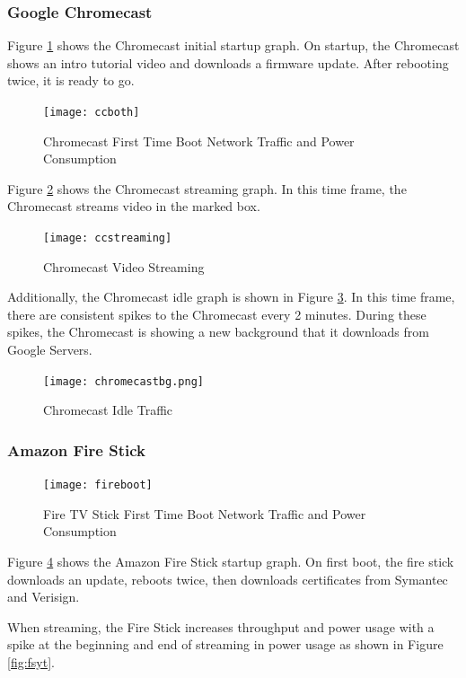\subsubsection{Google Chromecast}
Figure \ref{fig:ccboth} shows the Chromecast initial startup graph. On startup, the Chromecast shows an intro tutorial video and downloads a firmware update. After rebooting twice, it is ready to go.

\begin{figure}[H]
  \centering
  \texttt{[image: ccboth]}
  \caption{Chromecast First Time Boot Network Traffic and Power Consumption}
  \label{fig:ccboth}
\end{figure}

Figure \ref{fig:ccstream} shows the Chromecast streaming graph. In this time frame, the Chromecast streams video in the marked box.

\begin{figure}[H]
  \centering
  \texttt{[image: ccstreaming]}
  \caption{Chromecast Video Streaming}
  \label{fig:ccstream}
\end{figure}

Additionally, the Chromecast idle graph is shown in Figure \ref{fig:ccbg}. In this time frame, there are consistent spikes to the Chromecast every 2 minutes. During these spikes, the Chromecast is showing a new background that it downloads from Google Servers.

\begin{figure}[H]
  \centering
  \texttt{[image: chromecastbg.png]}
  \caption{Chromecast Idle Traffic}
  \label{fig:ccbg}
\end{figure}

\subsubsection{Amazon Fire Stick}

\begin{figure}[H]
  \centering
  \texttt{[image: fireboot]}
  \caption{Fire TV Stick First Time Boot Network Traffic and Power Consumption}
  \label{fig:fireboth}
\end{figure}

Figure \ref{fig:fireboth} shows the Amazon Fire Stick startup graph. On first boot, the fire stick downloads an update, reboots twice, then downloads certificates from Symantec and Verisign.

When streaming, the Fire Stick increases throughput and power usage with a spike at the beginning and end of streaming in power usage as shown in Figure \ref{fig:fsyt}.

